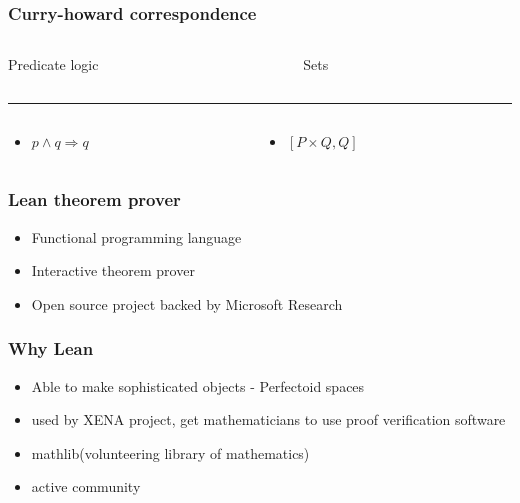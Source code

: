 \documentclass{beamer}
\begin{document}
\begin{frame}
    \frametitle{Curry-howard correspondence}
    \begin{columns}[T]
        \begin{column}{.48\textwidth}
        Predicate logic
        \end{column}
        \hfill
        \begin{column}{.48\textwidth}
        Sets
        \end{column}
    \end{columns}
    \color{black}\rule{\linewidth}{1pt}
    \begin{columns}[T]
        \begin{column}{.48\textwidth}
            \begin{itemize}
                \item $ p \wedge q \Rightarrow q $ \\
            \end{itemize}
        \end{column}
        \hfill
        \begin{column}{.48\textwidth}
            \begin{itemize}
                \item $ [ P \times Q, Q ] $
            \end{itemize}
        \end{column}
    \end{columns}
\end{frame}
\begin{frame}
    \frametitle{Lean theorem prover}
    \begin{itemize}
        \item Functional programming language
        \item Interactive theorem prover
        \item Open source project backed by Microsoft Research
    \end{itemize}
\end{frame}
\begin{frame}
    \frametitle{Why Lean}
    \begin{itemize}
        \item Able to make sophisticated objects - Perfectoid spaces
        \item used by XENA project, get mathematicians to use proof verification software
        \item mathlib(volunteering library of mathematics)
        \item active community
    \end{itemize}
\end{frame}
\end{document}
